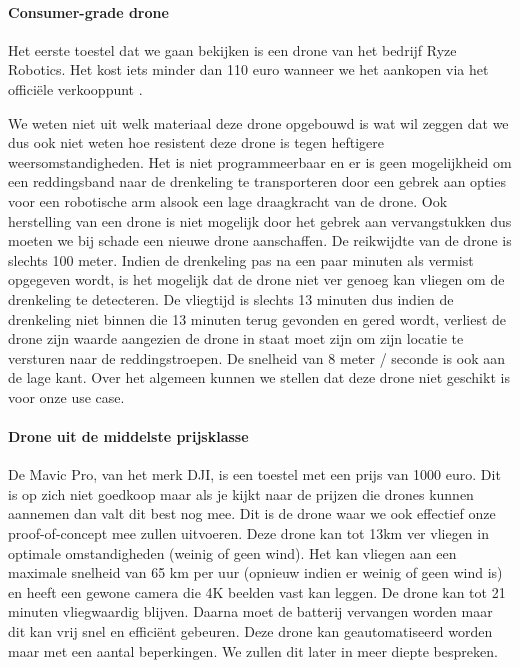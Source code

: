 \paragraph{Consumer-grade drone}

Het eerste toestel dat we gaan bekijken is een drone van het bedrijf Ryze Robotics. \autocite{CheapDrone} Het kost iets minder dan 110 euro wanneer we het aankopen via het officiële verkooppunt \autocite{CheapDroneOfficial}. 

We weten niet uit welk materiaal deze drone opgebouwd is wat wil zeggen dat we dus ook niet weten hoe resistent deze drone is tegen heftigere weersomstandigheden. Het is niet programmeerbaar en er is geen mogelijkheid om een reddingsband naar de drenkeling te transporteren door een gebrek aan opties voor een robotische arm alsook een lage draagkracht van de drone. Ook herstelling van een drone is niet mogelijk door het gebrek aan vervangstukken dus moeten we bij schade een nieuwe drone aanschaffen. De reikwijdte van de drone is slechts 100 meter. Indien de drenkeling pas na een paar minuten als vermist opgegeven wordt, is het mogelijk dat de drone niet ver genoeg kan vliegen om de drenkeling te detecteren. De vliegtijd is slechts 13 minuten dus indien de drenkeling niet binnen die 13 minuten terug gevonden en gered wordt, verliest de drone zijn waarde aangezien de drone  in staat moet zijn om zijn locatie te versturen naar de reddingstroepen. De snelheid van 8 meter / seconde is ook aan de lage kant.
Over het algemeen kunnen we stellen dat deze drone niet geschikt is voor onze use case.

\paragraph{Drone uit de middelste prijsklasse}

De Mavic Pro, van het merk DJI, is een toestel met een prijs van 1000 euro. Dit is op zich niet goedkoop maar als je kijkt naar de prijzen die drones kunnen aannemen dan valt dit best nog mee. Dit is de drone waar we ook effectief onze proof-of-concept mee zullen uitvoeren. Deze drone kan tot 13km ver vliegen in optimale omstandigheden (weinig of geen wind). Het kan vliegen aan een maximale snelheid van 65 km per uur (opnieuw indien er weinig of geen wind is) en heeft een gewone camera die 4K beelden vast kan leggen. De drone kan tot 21 minuten vliegwaardig blijven. Daarna moet de batterij vervangen worden maar dit kan vrij snel en efficiënt gebeuren. Deze drone kan geautomatiseerd worden maar met een aantal beperkingen. We zullen dit later in meer diepte bespreken.

